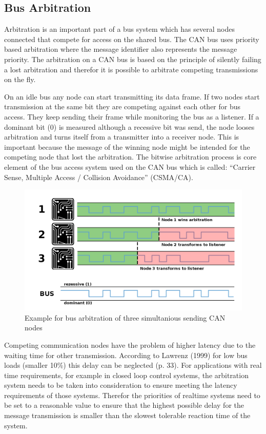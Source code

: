         
	\subsection{Bus Arbitration}
	Arbitration is an important part of a bus system which has several nodes
	connected that compete for access on the shared bus. The CAN bus uses
	priority based arbitration where the message identifier also represents the
	message priority. The arbitration on a CAN bus is based on the principle of
	silently failing a lost arbitration and therefor it is possible to arbitrate
	competing transmissions on the fly. 
	
	On an idle bus any node can start transmitting its data frame. If two nodes
	start transmission at the same bit they are competing against each other for
	bus access.
	They keep sending their frame while monitoring the bus as a listener. If a dominant
	bit (0) is measured although a recessive bit was send, the node looses
	arbitration and turns itself from a transmitter into a receiver node. This is
	important because the message of the winning node might be intended for the
	competing node that lost the arbitration. The bitwise arbitration process is
	core element of the bus access system used on the CAN bus which is called:
	``Carrier Sense, Multiple Access / Collision Avoidance'' (CSMA/CA).
	
	\begin{figure}[htb] \centering
		\includegraphics[width=1\textwidth]{content/pictures/arbitration.png}
		\caption{Example for bus arbitration of three simultanious sending CAN nodes}
		\label{fig:arbitration}
	\end{figure}
	
	Competing communication nodes have the problem of higher latency due to the
	waiting time for other transmission. According to Lawrenz (1999)
	\cite{canbook-lawrenz} for low bus loads (smaller 10\%) this delay can be
	neglected (p.
	33).
	For applications with real time requirements, for example in closed loop
	control systems, the arbitration system needs to be taken into consideration to ensure
	meeting the latency requirements of those systems. Therefor the priorities of
	realtime systems need to be set to a reasonable value to ensure that the
	highest possible delay for the message transmission is smaller than the
	slowest tolerable reaction time of the system.
	
